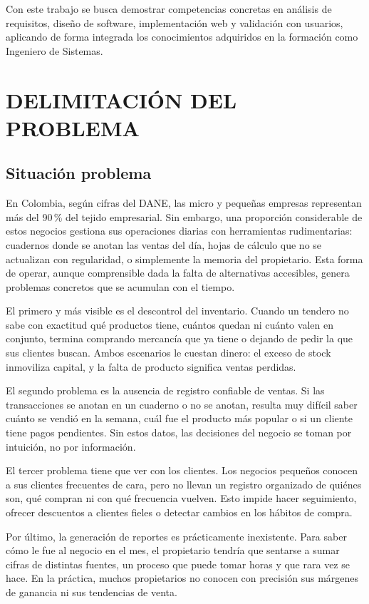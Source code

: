 \documentclass[spanish]{ieee_upb}
\begin{document}
Con este trabajo se busca demostrar competencias concretas en análisis de requisitos, diseño de software, implementación web y validación con usuarios, aplicando de forma integrada los conocimientos adquiridos en la formación como Ingeniero de Sistemas.

\newpage
\section{DELIMITACIÓN DEL PROBLEMA}

\subsection{Situación problema}

En Colombia, según cifras del DANE, las micro y pequeñas empresas representan más del 90\,\% del tejido empresarial. Sin embargo, una proporción considerable de estos negocios gestiona sus operaciones diarias con herramientas rudimentarias: cuadernos donde se anotan las ventas del día, hojas de cálculo que no se actualizan con regularidad, o simplemente la memoria del propietario. Esta forma de operar, aunque comprensible dada la falta de alternativas accesibles, genera problemas concretos que se acumulan con el tiempo.

El primero y más visible es el descontrol del inventario. Cuando un tendero no sabe con exactitud qué productos tiene, cuántos quedan ni cuánto valen en conjunto, termina comprando mercancía que ya tiene o dejando de pedir la que sus clientes buscan. Ambos escenarios le cuestan dinero: el exceso de stock inmoviliza capital, y la falta de producto significa ventas perdidas.

El segundo problema es la ausencia de registro confiable de ventas. Si las transacciones se anotan en un cuaderno o no se anotan, resulta muy difícil saber cuánto se vendió en la semana, cuál fue el producto más popular o si un cliente tiene pagos pendientes. Sin estos datos, las decisiones del negocio se toman por intuición, no por información.

El tercer problema tiene que ver con los clientes. Los negocios pequeños conocen a sus clientes frecuentes de cara, pero no llevan un registro organizado de quiénes son, qué compran ni con qué frecuencia vuelven. Esto impide hacer seguimiento, ofrecer descuentos a clientes fieles o detectar cambios en los hábitos de compra.

Por último, la generación de reportes es prácticamente inexistente. Para saber cómo le fue al negocio en el mes, el propietario tendría que sentarse a sumar cifras de distintas fuentes, un proceso que puede tomar horas y que rara vez se hace. En la práctica, muchos propietarios no conocen con precisión sus márgenes de ganancia ni sus tendencias de venta.
\end{document}
